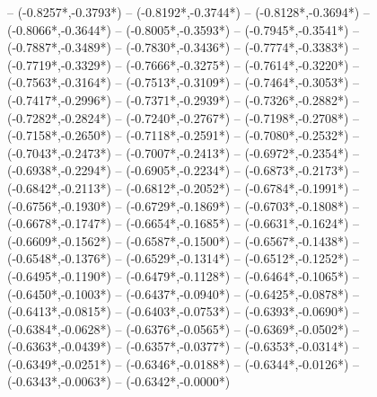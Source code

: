 {	-- ({-0.8257*\dx},{-0.3793*\dy})
	-- ({-0.8192*\dx},{-0.3744*\dy})
	-- ({-0.8128*\dx},{-0.3694*\dy})
	-- ({-0.8066*\dx},{-0.3644*\dy})
	-- ({-0.8005*\dx},{-0.3593*\dy})
	-- ({-0.7945*\dx},{-0.3541*\dy})
	-- ({-0.7887*\dx},{-0.3489*\dy})
	-- ({-0.7830*\dx},{-0.3436*\dy})
	-- ({-0.7774*\dx},{-0.3383*\dy})
	-- ({-0.7719*\dx},{-0.3329*\dy})
	-- ({-0.7666*\dx},{-0.3275*\dy})
	-- ({-0.7614*\dx},{-0.3220*\dy})
	-- ({-0.7563*\dx},{-0.3164*\dy})
	-- ({-0.7513*\dx},{-0.3109*\dy})
	-- ({-0.7464*\dx},{-0.3053*\dy})
	-- ({-0.7417*\dx},{-0.2996*\dy})
	-- ({-0.7371*\dx},{-0.2939*\dy})
	-- ({-0.7326*\dx},{-0.2882*\dy})
	-- ({-0.7282*\dx},{-0.2824*\dy})
	-- ({-0.7240*\dx},{-0.2767*\dy})
	-- ({-0.7198*\dx},{-0.2708*\dy})
	-- ({-0.7158*\dx},{-0.2650*\dy})
	-- ({-0.7118*\dx},{-0.2591*\dy})
	-- ({-0.7080*\dx},{-0.2532*\dy})
	-- ({-0.7043*\dx},{-0.2473*\dy})
	-- ({-0.7007*\dx},{-0.2413*\dy})
	-- ({-0.6972*\dx},{-0.2354*\dy})
	-- ({-0.6938*\dx},{-0.2294*\dy})
	-- ({-0.6905*\dx},{-0.2234*\dy})
	-- ({-0.6873*\dx},{-0.2173*\dy})
	-- ({-0.6842*\dx},{-0.2113*\dy})
	-- ({-0.6812*\dx},{-0.2052*\dy})
	-- ({-0.6784*\dx},{-0.1991*\dy})
	-- ({-0.6756*\dx},{-0.1930*\dy})
	-- ({-0.6729*\dx},{-0.1869*\dy})
	-- ({-0.6703*\dx},{-0.1808*\dy})
	-- ({-0.6678*\dx},{-0.1747*\dy})
	-- ({-0.6654*\dx},{-0.1685*\dy})
	-- ({-0.6631*\dx},{-0.1624*\dy})
	-- ({-0.6609*\dx},{-0.1562*\dy})
	-- ({-0.6587*\dx},{-0.1500*\dy})
	-- ({-0.6567*\dx},{-0.1438*\dy})
	-- ({-0.6548*\dx},{-0.1376*\dy})
	-- ({-0.6529*\dx},{-0.1314*\dy})
	-- ({-0.6512*\dx},{-0.1252*\dy})
	-- ({-0.6495*\dx},{-0.1190*\dy})
	-- ({-0.6479*\dx},{-0.1128*\dy})
	-- ({-0.6464*\dx},{-0.1065*\dy})
	-- ({-0.6450*\dx},{-0.1003*\dy})
	-- ({-0.6437*\dx},{-0.0940*\dy})
	-- ({-0.6425*\dx},{-0.0878*\dy})
	-- ({-0.6413*\dx},{-0.0815*\dy})
	-- ({-0.6403*\dx},{-0.0753*\dy})
	-- ({-0.6393*\dx},{-0.0690*\dy})
	-- ({-0.6384*\dx},{-0.0628*\dy})
	-- ({-0.6376*\dx},{-0.0565*\dy})
	-- ({-0.6369*\dx},{-0.0502*\dy})
	-- ({-0.6363*\dx},{-0.0439*\dy})
	-- ({-0.6357*\dx},{-0.0377*\dy})
	-- ({-0.6353*\dx},{-0.0314*\dy})
	-- ({-0.6349*\dx},{-0.0251*\dy})
	-- ({-0.6346*\dx},{-0.0188*\dy})
	-- ({-0.6344*\dx},{-0.0126*\dy})
	-- ({-0.6343*\dx},{-0.0063*\dy})
	-- ({-0.6342*\dx},{-0.0000*\dy})
}
